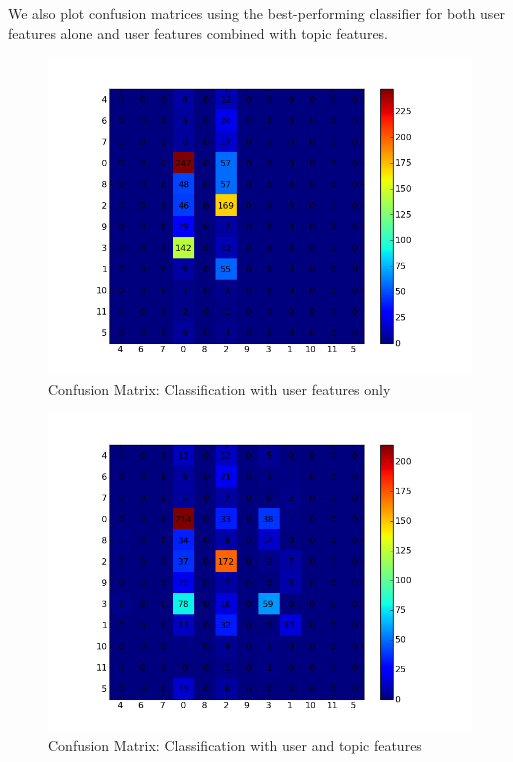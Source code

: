 We also plot confusion matrices using the best-performing classifier for both user features alone and user features combined with topic features.

\begin{figure}[H]
	\centering
	\includegraphics[scale=0.35]{Figures/no_topic_features_confusion.png}
	\caption{Confusion Matrix: Classification with user features only}
	\label{fig:useronlyconfusion}
\end{figure}

\begin{figure}[H]
	\centering
	\includegraphics[scale=0.35]{Figures/boydstun_confusion.png}
	\caption{Confusion Matrix: Classification with user and topic features}
	\label{fig:boydstunconfusion}
\end{figure}


